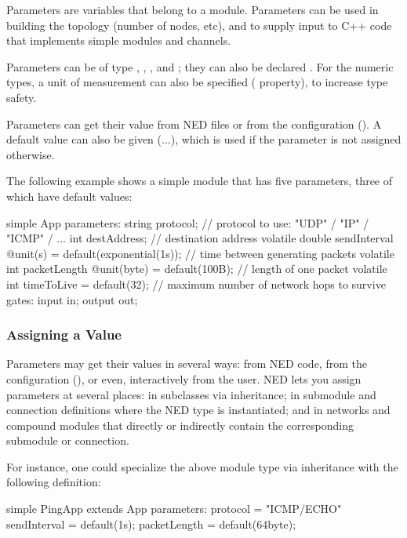 Parameters are variables that belong to a module. Parameters can be
used in building the topology (number of nodes, etc), and to supply
input to C++ code that implements simple modules and channels.

Parameters can be of type , ,
,  and ; they can also
be declared . For the numeric types, a unit of
measurement can also be specified ( property), to increase
type safety.

Parameters can get their value from NED files or from the configuration
(). A default value can also be given (...\ttt{)}),
which is used if the parameter is not assigned otherwise.

The following example shows a simple module that has five parameters, three
of which have default values:

\begin{ned}
simple App
{
    parameters:
        string protocol;       // protocol to use: "UDP" / "IP" / "ICMP" / ...
        int destAddress;       // destination address
        volatile double sendInterval @unit(s) = default(exponential(1s));
                               // time between generating packets
        volatile int packetLength @unit(byte) = default(100B);
                               // length of one packet
        volatile int timeToLive = default(32);
                               // maximum number of network hops to survive
    gates:
        input in;
        output out;
}
\end{ned}


\subsubsection{Assigning a Value}

Parameters may get their values in several ways: from NED code, from the
configuration (), or even, interactively from the
user. NED lets you assign parameters at several places: in subclasses via
inheritance; in submodule and connection definitions where the NED type is
instantiated; and in networks and compound modules that directly or
indirectly contain the corresponding submodule or connection.

For instance, one could specialize the above  module type via
inheritance with the following definition:

\begin{ned}
simple PingApp extends App
{
    parameters:
        protocol = "ICMP/ECHO"
        sendInterval = default(1s);
        packetLength = default(64byte);
}
\end{ned}

